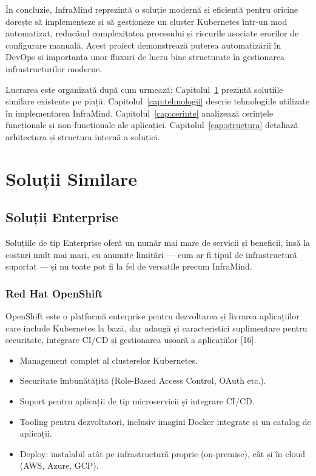 \documentclass[12pt,a4paper]{report}
\begin{document}
În concluzie, InfraMind reprezintă o soluție modernă și eficientă pentru oricine dorește să implementeze și să gestioneze un cluster Kubernetes într-un mod automatizat, reducând complexitatea procesului și riscurile asociate erorilor de configurare manuală. Acest proiect demonstrează puterea automatizării în DevOps și importanța unor fluxuri de lucru bine structurate în gestionarea infrastructurilor moderne.

Lucrarea este organizată după cum urmează: Capitolul~\ref{cap:similare} prezintă soluțiile similare existente pe piață. Capitolul~\ref{cap:tehnologii} descrie tehnologiile utilizate în implementarea InfraMind. Capitolul~\ref{cap:cerinte} analizează cerințele funcționale și non-funcționale ale aplicației. Capitolul~\ref{cap:structura} detaliază arhitectura și structura internă a soluției.
\chapter{Soluții Similare}
\label{cap:similare}
\section{Soluții Enterprise}
Soluțiile de tip Enterprise oferă un număr mai mare de servicii și beneficii, însă la costuri mult mai mari, cu anumite limitări — cum ar fi tipul de infrastructură suportat — și nu toate pot fi la fel de versatile precum InfraMind.

\subsection{Red Hat OpenShift}

OpenShift este o platformă enterprise pentru dezvoltarea și livrarea aplicațiilor care include Kubernetes la bază, dar adaugă și caracteristici suplimentare pentru securitate, integrare CI/CD și gestionarea ușoară a aplicațiilor [16].

\begin{itemize}
  \item Management complet al clusterelor Kubernetes.
  \item Securitate îmbunătățită (Role-Based Access Control, OAuth etc.).
  \item Suport pentru aplicații de tip microservicii și integrare CI/CD.
  \item Tooling pentru dezvoltatori, inclusiv imagini Docker integrate și un catalog de aplicații.
  \item Deploy: instalabil atât pe infrastructură proprie (on-premise), cât și în cloud (AWS, Azure, GCP).
\end{itemize}
\end{document}
